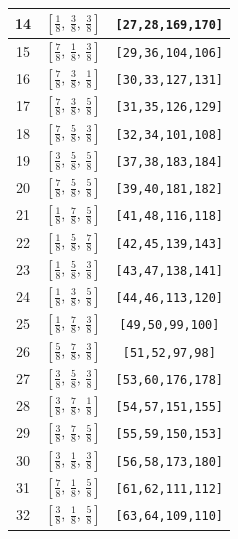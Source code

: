 \documentclass[fleqn,8pt]{jsarticle}
\begin{document}
\begin{longtable}{ccc}
14 & $\left[ \frac{1}{8},\, \frac{3}{8},\, \frac{3}{8} \right]$ & {\tt [27,28,169,170]} \\ \hline
15 & $\left[ \frac{7}{8},\, \frac{1}{8},\, \frac{3}{8} \right]$ & {\tt [29,36,104,106]} \\ \hline
16 & $\left[ \frac{7}{8},\, \frac{3}{8},\, \frac{1}{8} \right]$ & {\tt [30,33,127,131]} \\ \hline
17 & $\left[ \frac{7}{8},\, \frac{3}{8},\, \frac{5}{8} \right]$ & {\tt [31,35,126,129]} \\ \hline
18 & $\left[ \frac{7}{8},\, \frac{5}{8},\, \frac{3}{8} \right]$ & {\tt [32,34,101,108]} \\ \hline
19 & $\left[ \frac{3}{8},\, \frac{5}{8},\, \frac{5}{8} \right]$ & {\tt [37,38,183,184]} \\ \hline
20 & $\left[ \frac{7}{8},\, \frac{5}{8},\, \frac{5}{8} \right]$ & {\tt [39,40,181,182]} \\ \hline
21 & $\left[ \frac{1}{8},\, \frac{7}{8},\, \frac{5}{8} \right]$ & {\tt [41,48,116,118]} \\ \hline
22 & $\left[ \frac{1}{8},\, \frac{5}{8},\, \frac{7}{8} \right]$ & {\tt [42,45,139,143]} \\ \hline
23 & $\left[ \frac{1}{8},\, \frac{5}{8},\, \frac{3}{8} \right]$ & {\tt [43,47,138,141]} \\ \hline
24 & $\left[ \frac{1}{8},\, \frac{3}{8},\, \frac{5}{8} \right]$ & {\tt [44,46,113,120]} \\ \hline
25 & $\left[ \frac{1}{8},\, \frac{7}{8},\, \frac{3}{8} \right]$ & {\tt [49,50,99,100]} \\ \hline
26 & $\left[ \frac{5}{8},\, \frac{7}{8},\, \frac{3}{8} \right]$ & {\tt [51,52,97,98]} \\ \hline
27 & $\left[ \frac{3}{8},\, \frac{5}{8},\, \frac{3}{8} \right]$ & {\tt [53,60,176,178]} \\ \hline
28 & $\left[ \frac{3}{8},\, \frac{7}{8},\, \frac{1}{8} \right]$ & {\tt [54,57,151,155]} \\ \hline
29 & $\left[ \frac{3}{8},\, \frac{7}{8},\, \frac{5}{8} \right]$ & {\tt [55,59,150,153]} \\ \hline
30 & $\left[ \frac{3}{8},\, \frac{1}{8},\, \frac{3}{8} \right]$ & {\tt [56,58,173,180]} \\ \hline
31 & $\left[ \frac{7}{8},\, \frac{1}{8},\, \frac{5}{8} \right]$ & {\tt [61,62,111,112]} \\ \hline
32 & $\left[ \frac{3}{8},\, \frac{1}{8},\, \frac{5}{8} \right]$ & {\tt [63,64,109,110]} \\ \hline

\end{longtable}
\end{document}

